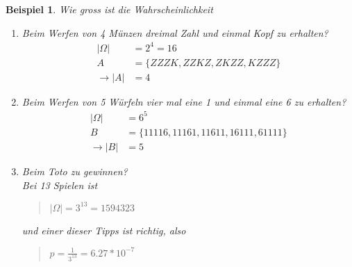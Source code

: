 \documentclass{report}
\newtheorem{myexample}{Beispiel}
\begin{document}
\begin{myexample}
Wie gross ist die Wahrscheinlichkeit
\begin{enumerate}
\item Beim Werfen von 4 Münzen dreimal Zahl und einmal Kopf zu erhalten?\\
\begin{align*}
 |\Omega| &= 2^4 = 16\\
 A &= \{ ZZZK, ZZKZ, ZKZZ, KZZZ \}\\
 \rightarrow |A| &= 4
\end{align*}

\item Beim Werfen von 5 Würfeln vier mal eine 1 und einmal eine 6 zu erhalten?
\begin{align*}
 |\Omega| &= 6^5\\
 B &= \{ 11116, 11161, 11611, 16111, 61111 \}\\
 \rightarrow |B| &= 5
\end{align*}

\item Beim Toto zu gewinnen?\\
Bei 13 Spielen ist
\begin{quote}
$|\Omega| = 3^{13} = 1594323$
\end{quote}
und einer dieser Tipps ist richtig, also
\begin{quote}
$p = \frac{1}{3^{13}} = 6.27 * 10^{-7}$
\end{quote}
\end{enumerate}
\end{myexample}
\end{document}
